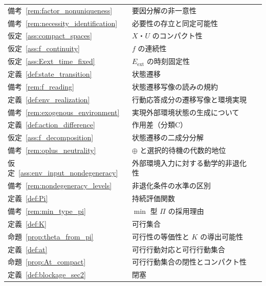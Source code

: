 \begin{longtable}{p{2.4cm} p{10.4cm} r}
備考~\ref{rem:factor_nonuniqueness} & 要因分解の非一意性 & \pageref{rem:factor_nonuniqueness} \\
備考~\ref{rem:necessity_identification} & 必要性の存立と同定可能性 & \pageref{rem:necessity_identification} \\
仮定~\ref{ass:compact_spaces} & $X$・$U$ のコンパクト性 & \pageref{ass:compact_spaces} \\
仮定~\ref{ass:f_continuity} & $f$ の連続性 & \pageref{ass:f_continuity} \\
仮定~\ref{ass:Eext_time_fixed} & $E_{\mathrm{ext}}$ の時刻固定性 & \pageref{ass:Eext_time_fixed} \\
定義~\ref{def:state_transition} & 状態遷移 & \pageref{def:state_transition} \\
備考~\ref{rem:f_reading} & 状態遷移写像の読みの規約 & \pageref{rem:f_reading} \\
定義~\ref{def:env_realization} & 行動応答成分の遷移写像と環境実現 & \pageref{def:env_realization} \\
備考~\ref{rem:exogenous_environment} & 実現外部環境状態の生成について & \pageref{rem:exogenous_environment} \\
定義~\ref{def:action_difference} & 作用差（分類C） & \pageref{def:action_difference} \\
仮定~\ref{ass:f_decomposition} & 状態遷移の二成分分解 & \pageref{ass:f_decomposition} \\
備考~\ref{rem:oplus_neutrality} & $\oplus$ と選択的待機の代数的地位 & \pageref{rem:oplus_neutrality} \\
仮定~\ref{ass:env_input_nondegeneracy} & 外部環境入力に対する動学的非退化性 & \pageref{ass:env_input_nondegeneracy} \\
備考~\ref{rem:nondegeneracy_levels} & 非退化条件の水準の区別 & \pageref{rem:nondegeneracy_levels} \\
定義~\ref{def:Pi} & 持続評価関数 & \pageref{def:Pi} \\
備考~\ref{rem:min_type_pi} & $\min$ 型 $\Pi$ の採用理由 & \pageref{rem:min_type_pi} \\
定義~\ref{def:K} & 可行集合 & \pageref{def:K} \\
命題~\ref{prop:theta_from_pi} & 可行性の等価性と $K$ の導出可能性 & \pageref{prop:theta_from_pi} \\
定義~\ref{def:at} & 可行行動対応と可行行動集合 & \pageref{def:at} \\
命題~\ref{prop:At_compact} & 可行行動集合の閉性とコンパクト性 & \pageref{prop:At_compact} \\
定義~\ref{def:blockage_sec2} & 閉塞 & \pageref{def:blockage_sec2} \\

\end{longtable}
